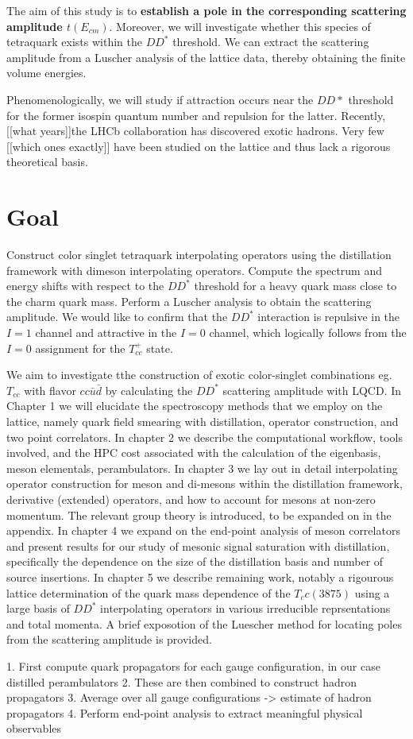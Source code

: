 The aim of this study is to \textbf{establish a pole in the corresponding scattering amplitude $t(E_{cm})$}. Moreover, we will investigate whether this species of tetraquark exists within the $DD^*$ threshold. We can extract the scattering amplitude from a Luscher analysis of the lattice data, thereby obtaining the finite volume energies. 

Phenomenologically, we will study if attraction occurs near the $DD*$ threshold for the former isospin quantum number and repulsion for the latter. Recently, [[what years]]the LHCb collaboration has discovered exotic hadrons. Very few [[which ones exactly]] have been studied on the lattice and thus lack a rigorous theoretical basis.
\section{Goal}
Construct color singlet tetraquark interpolating operators using the distillation framework with dimeson interpolating operators. Compute the spectrum and energy shifts with respect to the $DD^*$ threshold for a heavy quark mass close to the charm quark mass. Perform a Luscher analysis to obtain the scattering amplitude. We would like to confirm that the $DD^*$ interaction is repulsive in the $I=1$ channel and attractive in the $I=0$ channel, which logically follows from the $I=0$ assignment for the $T_{cc}^+$ state. 

We aim to investigate tthe construction of exotic color-singlet combinations eg. $T_{cc}$ with flavor $cc\bar{u}\bar{d}$ by calculating the $DD^*$ scattering amplitude with LQCD. In Chapter 1 we will elucidate the spectroscopy methods that we employ on the lattice, namely quark field smearing with distillation, operator construction, and two point correlators. In chapter 2 we describe the computational workflow, tools involved, and the HPC cost associated with the calculation of the eigenbasis, meson elementals, perambulators. In chapter 3 we lay out in detail interpolating operator construction for meson and di-mesons within the distillation framework, derivative (extended) operators, and how to account for mesons at non-zero momentum. The relevant group theory is introduced, to be expanded on in the appendix. In chapter 4 we expand on the end-point analysis of meson correlators and present results for our study of mesonic signal saturation with distillation, specifically the dependence on the size of the distillation basis and number of source insertions. In chapter 5 we describe remaining work, notably a rigourous lattice determination of the quark mass dependence of the $T_cc(3875)$ using a large basis of $DD^*$ interpolating operators in various irreducible reprsentations and total momenta. A brief exposotion of the Luescher method for locating poles from the scattering amplitude is provided. 

1. First compute quark propagators for each gauge configuration, in our case distilled perambulators 
2. These are then combined to construct hadron propagators 
3. Average over all gauge configurations -> estimate of hadron propagators 
4. Perform end-point analysis to extract meaningful physical observables


